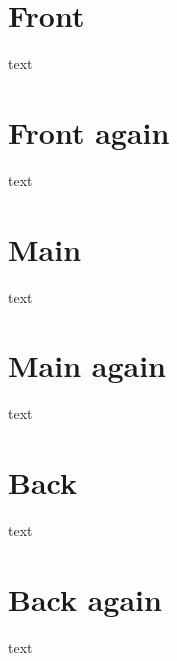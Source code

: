 \documentclass{book}
\begin{document}
\frontmatter
\chapter{Front}
text
\chapter{Front again}
text

\mainmatter
\chapter{Main}
text
\chapter{Main again}
text

\backmatter
{}
\chapter{Back}
text
\chapter{Back again}
text
\end{document}
